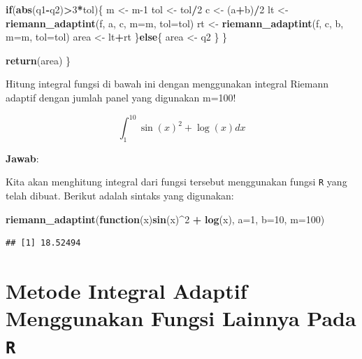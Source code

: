 \documentclass[]{book}
\newenvironment{Shaded}{\begin{snugshade}}{\end{snugshade}}
\newcommand{\ControlFlowTok}[1]{\textcolor[rgb]{0.13,0.29,0.53}{\textbf{#1}}}
\newcommand{\DataTypeTok}[1]{\textcolor[rgb]{0.13,0.29,0.53}{#1}}
\newcommand{\DecValTok}[1]{\textcolor[rgb]{0.00,0.00,0.81}{#1}}
\newcommand{\KeywordTok}[1]{\textcolor[rgb]{0.13,0.29,0.53}{\textbf{#1}}}
\newcommand{\NormalTok}[1]{#1}
\newcommand{\OperatorTok}[1]{\textcolor[rgb]{0.81,0.36,0.00}{\textbf{#1}}}
\newcommand{\StringTok}[1]{\textcolor[rgb]{0.31,0.60,0.02}{#1}}
\theoremstyle{definition}
\theoremstyle{definition}
\theoremstyle{definition}
\theoremstyle{remark}
\let\BeginKnitrBlock\begin \let\EndKnitrBlock\end
\begin{document}
\begin{Shaded}
\begin{Highlighting}[]
    \ControlFlowTok{if}\NormalTok{(}\KeywordTok{abs}\NormalTok{(q1}\OperatorTok{-}\NormalTok{q2)}\OperatorTok{>}\DecValTok{3}\OperatorTok{*}\NormalTok{tol)\{}
\NormalTok{      m <-}\StringTok{ }\NormalTok{m}\DecValTok{-1}
\NormalTok{      tol <-}\StringTok{ }\NormalTok{tol}\OperatorTok{/}\DecValTok{2}
\NormalTok{      c <-}\StringTok{ }\NormalTok{(a}\OperatorTok{+}\NormalTok{b)}\OperatorTok{/}\DecValTok{2}
\NormalTok{      lt <-}\StringTok{ }\KeywordTok{riemann_adaptint}\NormalTok{(f, a, c, }\DataTypeTok{m=}\NormalTok{m, }\DataTypeTok{tol=}\NormalTok{tol)}
\NormalTok{      rt <-}\StringTok{ }\KeywordTok{riemann_adaptint}\NormalTok{(f, c, b, }\DataTypeTok{m=}\NormalTok{m, }\DataTypeTok{tol=}\NormalTok{tol) }
\NormalTok{      area <-}\StringTok{ }\NormalTok{lt}\OperatorTok{+}\NormalTok{rt}
\NormalTok{    \}}\ControlFlowTok{else}\NormalTok{\{}
\NormalTok{      area <-}\StringTok{ }\NormalTok{q2}
\NormalTok{    \}}
\NormalTok{  \}}
  
  \KeywordTok{return}\NormalTok{(area)}
\NormalTok{\}}
\end{Highlighting}
\end{Shaded}

\BeginKnitrBlock{example}
\protect\hypertarget{exm:adaptexm}{}{\label{exm:adaptexm} }Hitung integral fungsi di bawah ini dengan menggunakan integral Riemann adaptif dengan jumlah panel yang digunakan m=100!
\EndKnitrBlock{example}

\[
\int_{1}^{10} \sin\left(x\right)^2+\log\left(x\right)dx
\]

\textbf{Jawab}:

Kita akan menghitung integral dari fungsi tersebut menggunakan fungsi \texttt{R} yang telah dibuat. Berikut adalah sintaks yang digunakan:

\begin{Shaded}
\begin{Highlighting}[]
\KeywordTok{riemann_adaptint}\NormalTok{(}\ControlFlowTok{function}\NormalTok{(x)}\KeywordTok{sin}\NormalTok{(x)}\OperatorTok{^}\DecValTok{2} \OperatorTok{+}\StringTok{ }\KeywordTok{log}\NormalTok{(x),}
                 \DataTypeTok{a=}\DecValTok{1}\NormalTok{, }\DataTypeTok{b=}\DecValTok{10}\NormalTok{, }\DataTypeTok{m=}\DecValTok{100}\NormalTok{)}
\end{Highlighting}
\end{Shaded}

\begin{verbatim}
## [1] 18.52494
\end{verbatim}

\hypertarget{metode-integral-adaptif-menggunakan-fungsi-lainnya-pada-r}{%
\section{\texorpdfstring{Metode Integral Adaptif Menggunakan Fungsi Lainnya Pada \texttt{R}}{Metode Integral Adaptif Menggunakan Fungsi Lainnya Pada R}}\label{metode-integral-adaptif-menggunakan-fungsi-lainnya-pada-r}}
\end{document}
